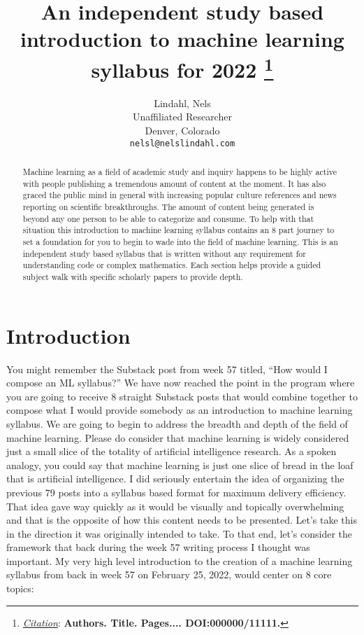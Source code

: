 \documentclass{article}
\title{An independent study based introduction to machine learning syllabus for 2022
\thanks{\textit{\underline{Citation}}: 
\textbf{Authors. Title. Pages.... DOI:000000/11111.}} 
}
\author{
  Lindahl, Nels \\
  Unaffiliated Researcher \\
  Denver, Colorado\\
   \texttt{nelsl@nelslindahl.com} \\
}
\begin{document}
\maketitle


\begin{abstract}
Machine learning as a field of academic study and inquiry happens to be highly active with people publishing a tremendous amount of content at the moment. It has also graced the public mind in general with increasing popular culture references and news reporting on scientific breakthroughs. The amount of content being generated is beyond any one person to be able to categorize and consume. To help with that situation this introduction to machine learning syllabus contains an 8 part journey to set a foundation for you to begin to wade into the field of machine learning. This is an independent study based syllabus that is written without any requirement for understanding code or complex mathematics. Each section helps provide a guided subject walk with specific scholarly papers to provide depth.   
\end{abstract}




\section{Introduction}
You might remember the Substack post from week 57 titled, “How would I compose an ML syllabus?” We have now reached the point in the program where you are going to receive 8 straight Substack posts that would combine together to compose what I would provide somebody as an introduction to machine learning syllabus. We are going to begin to address the breadth and depth of the field of machine learning. Please do consider that machine learning is widely considered just a small slice of the totality of artificial intelligence research. As a spoken analogy, you could say that machine learning is just one slice of bread in the loaf that is artificial intelligence. I did seriously entertain the idea of organizing the previous 79 posts into a syllabus based format for maximum delivery efficiency. That idea gave way quickly as it would be visually and topically overwhelming and that is the opposite of how this content needs to be presented. Let’s take this in the direction it was originally intended to take. To that end, let’s consider the framework that back during the week 57 writing process I thought was important. My very high level introduction to the creation of a machine learning syllabus from back in week 57 on February 25, 2022, would center on 8 core topics:
\end{document}
